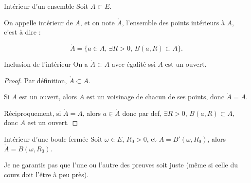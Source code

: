 \begin{definition}{Intérieur d'un ensemble}{}
    Soit $A \subset E$. 

    On appelle intérieur de $A$, et on note $\mathring{A}$, l'ensemble des points intérieurs à $A$, 
    c'est à dire : 

    $$ \mathring{A} = \{a \in A, \, \exists R > 0, \, B(a, R) \subset A\}.$$
\end{definition}

\begin{proposition}{Inclusion de l'intérieur}{}
    On a $\mathring{A} \subset A$ avec égalité ssi $A$ est un ouvert.
\end{proposition}

\begin{proof}
    Par définition, $\mathring{A} \subset A$.

    Si $A$ est un ouvert, alors $A$ est un voisinage de chacun de ses points, donc $\mathring{A} = A$.

    Réciproquement, si $\mathring{A} = A$, 
    alors $a \in \mathring A$ donc par def, $\exists R > 0, \, B(a, R) \subset A$, donc $A$ est un ouvert.
\end{proof}

\begin{corollaire}{Intérieur d'une boule fermée}{}
    Soit $\omega \in E, \, R_0 > 0$, et $A = B'(\omega, R_0)$, alors $\mathring{A} = B(\omega, R_0)$.
\end{corollaire}

Je ne garantis pas que l'une ou l'autre des preuves soit juste (même si celle du cours 
doit l'être à peu près). 


